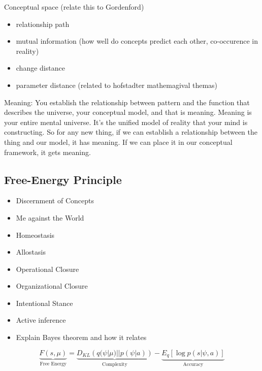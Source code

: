 Conceptual space (relate this to Gordenford)
\begin{itemize}
    \item relationship path 
    \item mutual information (how well do concepts predict each other, co-occurence in reality)
    \item change distance
    \item parameter distance (related to hofstadter mathemagival themas)
\end{itemize}

Meaning: You establish the relationship between pattern and the function that describes the universe, your conceptual model, and that is meaning. Meaning is your entire mental universe. It’s the unified model of reality that your mind is constructing. So for any new thing, if we can establish a relationship between the thing and our model, it has meaning. If we can place it in our conceptual framework, it gets meaning. 


\subsection{Free-Energy Principle}
\begin{itemize}
    \item Discernment of Concepts
    \item Me against the World
    \item Homeostasis
    \item Allostasis
    \item Operational Closure
    \item Organizational Closure
    \item Intentional Stance
    \item Active inference
    \item Explain Bayes theorem and how it relates 
\end{itemize}

\begin{equation}
    \underbrace{F(s, \mu)}_{\text{Free Energy}} = \underbrace{D_{KL}\left(q(\psi|\mu) || p(\psi|a)\right)}_{\text{Complexity}} - \underbrace{E_q\left[\log p(s|\psi, a)\right]}_{\text{Accuracy}}
\end{equation}

